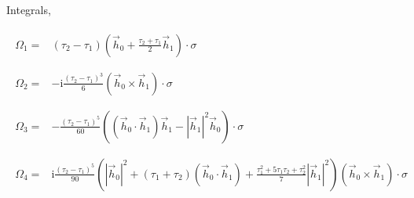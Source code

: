 \documentclass[10pt,fleqn]{article}
\newcommand{\ui}{\mathrm{i}}
\newcommand{\eqar}[1]
{
  \begin{align}
    #1
  \end{align}
}
\newcommand{\paren}[1]{{\left({#1}\right)}}
\newcommand{\abs}[1]{{\left|{#1}\right|}}
\begin{document}
Integrals,
\eqar{
  \begin{split}
    \Omega_1=&\paren{\tau_2-\tau_1}\paren{\vec h_0+\frac{\tau_2+\tau_1}{2}\vec h_1}\cdot\sigma\\
  \end{split}\\
  \begin{split}
    \Omega_2=&-\ui\frac{\paren{\tau_2-\tau_1}^3}{6}\paren{\vec h_0\times\vec h_1}\cdot\sigma\\
  \end{split}\\
  \begin{split}
    \Omega_3=&-\frac{\paren{\tau_2-\tau_1}^5}{60}\paren{\paren{\vec h_0\cdot\vec h_1}\vec h_1-\abs{\vec h_1}^2\vec h_0}\cdot\sigma\\
  \end{split}\\
  \begin{split}
    \Omega_4=&\ui\frac{\paren{\tau_2-\tau_1}^5}{90}
               \paren{
               \abs{\vec h_0}^2
               +\paren{\tau_1+\tau_2}\paren{\vec h_0\cdot\vec h_1}
               +\frac{\tau_1^2+5\tau_1\tau_2+\tau_2^2}{7}
               \abs{\vec h_1}^2}\paren{\vec h_0\times\vec h_1}\cdot\sigma\\
  \end{split}
}
\end{document}
